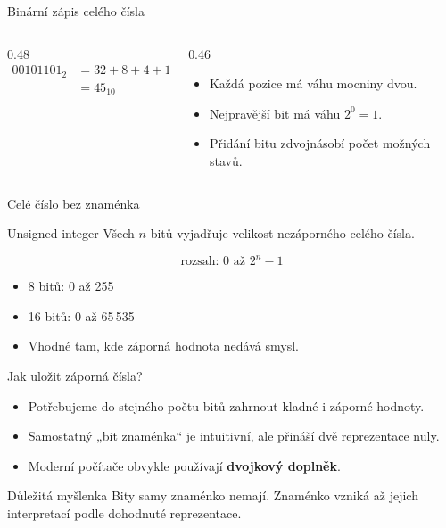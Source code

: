 \documentclass[aspectratio=169]{beamer}
\newcommand{\term}[1]{\textcolor{CodeBlue}{\textbf{#1}}}
\begin{document}
\begin{frame}{Binární zápis celého čísla}
  \begin{columns}[T]
    \begin{column}{0.48\textwidth}
      \centering
      \large{}\rmfamily
      \begin{align*}
        00101101_2
          &= 32+8+4+1 \\
          &= 45_{10}
      \end{align*}
    \end{column}
    \begin{column}{0.46\textwidth}
      \begin{itemize}
        \item Každá pozice má váhu mocniny dvou.
        \item Nejpravější bit má váhu $2^0=1$.
        \item Přidání bitu zdvojnásobí počet možných stavů.
      \end{itemize}
    \end{column}
  \end{columns}
\end{frame}

\begin{frame}{Celé číslo bez znaménka}
  \begin{block}{Unsigned integer}
    Všech $n$ bitů vyjadřuje velikost nezáporného celého čísla.
  \end{block}
  \[
    \text{rozsah: } 0 \text{ až } 2^n-1
  \]
  \begin{itemize}
    \item 8 bitů: 0 až 255
    \item 16 bitů: 0 až 65\,535
    \item Vhodné tam, kde záporná hodnota nedává smysl.
  \end{itemize}
\end{frame}

\begin{frame}{Jak uložit záporná čísla?}
  \begin{itemize}
    \item Potřebujeme do stejného počtu bitů zahrnout kladné i záporné hodnoty.
    \item Samostatný „bit znaménka“ je intuitivní, ale přináší dvě reprezentace nuly.
    \item Moderní počítače obvykle používají \term{dvojkový doplněk}.
  \end{itemize}
  \begin{block}{Důležitá myšlenka}
    Bity samy znaménko nemají. Znaménko vzniká až jejich interpretací podle dohodnuté reprezentace.
  \end{block}
\end{frame}
\end{document}
